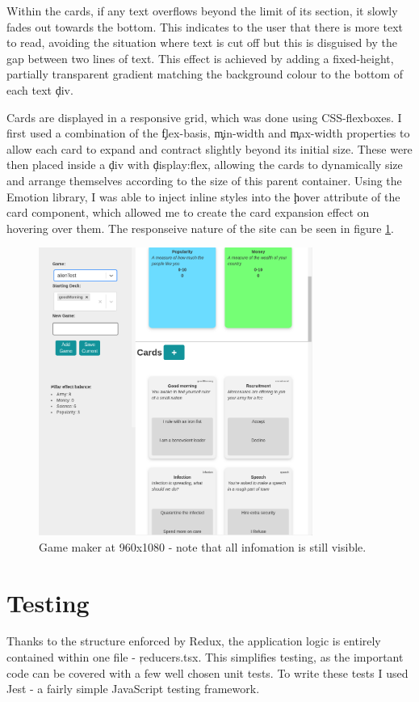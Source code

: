 Within the cards, if any text overflows beyond the limit of its section, it slowly fades out towards the bottom. This indicates to the user that there is more text to read, avoiding the situation where text is cut off but this is disguised by the gap between two lines of text. This effect is achieved by adding a fixed-height, partially transparent gradient matching the background colour to the bottom of each text \c{div}.

Cards are displayed in a responsive grid, which was done using CSS-flexboxes. I first used a combination of the \c{flex-basis}, \c{min-width} and \c{max-width} properties to allow each card to expand and contract slightly beyond its initial size. These were then placed inside a \c{div} with \c{display:flex}, allowing the cards to dynamically size and arrange themselves according to the size of this parent container. Using the Emotion\cite{Emotion} library, I was able to inject inline styles into the \c{hover} attribute of the card component, which allowed me to create the card expansion effect on hovering over them. The responseive nature of the site can be seen in figure \ref{fig:responsive}.

\begin{figure}[!h]
	\centering
	\includegraphics[width=0.8\textwidth]{./images/impl/responsive.png}
	\caption{Game maker at 960x1080 - note that all infomation is still visible.}
	\label{fig:responsive}
\end{figure}

\section{Testing}
Thanks to the structure enforced by Redux, the application logic is entirely contained within one file - \c{reducers.tsx}. This simplifies testing, as the important code can be covered with a few well chosen unit tests. To write these tests I used Jest\cite{Jest} - a fairly simple JavaScript testing framework.